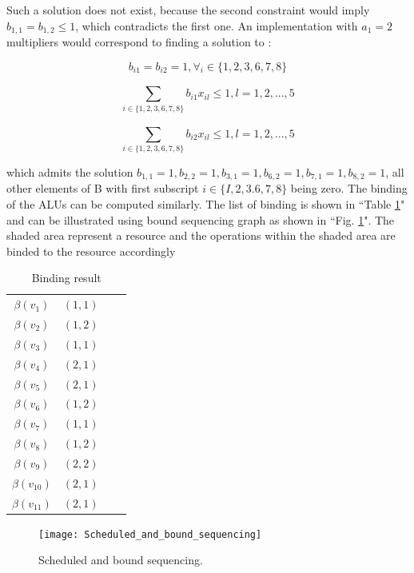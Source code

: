 Such a solution does not exist, because the second constraint would imply $ b_{1,1}=b_{1,2} \leq 1 $, which contradicts the first one. An implementation with $ a_{1} =2$ multipliers would correspond to finding a solution to \cite{main}:


\begin{equation}\label{b}
 b_{i1}=b_{i2} = 1, \forall_{i} \in \{1,2,3,6,7,8\}
\end{equation}

\begin{equation}\label{c}
\sum_{i\in \{1,2,3,6,7,8\}}^{} b_{i1} x_{il} \leq 1, l=1,2,...,5
\end{equation}

\begin{equation}\label{c}
\sum_{i\in \{1,2,3,6,7,8\}}^{} b_{i2} x_{il} \leq 1, l=1,2,...,5
\end{equation}

which admits the solution $ b_{1,1}=1,b_{2,2}=1,b_{3,1}=1,b_{6,2}=1,b_{7,1}=1,b_{8,2}=1 $, all other elements of B with first subscript $ i \in \{I, 2,3.6,7,8\}$ being zero. The binding of the ALUs can be computed similarly. The list of binding is shown in ``Table \ref{tab1}" and can be illustrated using bound sequencing graph as shown in ``Fig. \ref{Scheduled_and_bound_sequencing}". The shaded area represent a resource and the operations within the shaded area are binded to the resource accordingly 


\begin{table}[htbp]
\caption{Binding result}
\begin{center}
\begin{tabular}{|c|c|c|c|}
\hline
$\beta(v_{1})$ & $(1,1)$  \\
$\beta(v_{2})$ &  $(1,2)$\\
$\beta(v_{3})$ &  $(1,1)$\\
$\beta(v_{4})$ &  $(2,1)$\\
$\beta(v_{5})$ &  $(2,1)$\\
$\beta(v_{6})$ &  $(1,2)$\\
$\beta(v_{7})$ &  $(1,1)$\\
$\beta(v_{8})$ &  $(1,2)$\\
$\beta(v_{9})$ &  $(2,2)$\\
$\beta(v_{10})$ &  $(2,1)$\\
$\beta(v_{11})$ &  $(2,1)$\\
\hline
\end{tabular}
\label{tab1}
\end{center}
\end{table}


\begin{figure}[h]
    \centering
    \texttt{[image: Scheduled\_and\_bound\_sequencing]}
    \caption{Scheduled and bound sequencing. \cite{main}}
    \label{Scheduled_and_bound_sequencing}
\end{figure}


